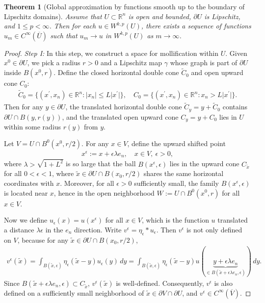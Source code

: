 \documentclass{article}
\numberwithin{equation}{section}
\newcommand{\bbR}{\mathbb{R}}
\newcommand{\ol}{\overline}
\newcommand{\wt}{\widetilde}
\theoremstyle{plain}
\newtheorem{theorem}{Theorem}[section]
\theoremstyle{definition}
\begin{document}
\begin{theorem}[Global approximation by functions smooth up to the boundary of Lipschitz domains]\label{thm:2.13}
Assume that $U\subset\bbR^n$ is open and bounded, $\partial U$ is Lipschitz, and $1\leq p<\infty$. Then for each $u\in W^{k,p}(U)$, there exists a sequence of functions $u_m\in C^\infty(\ol{U})$ such that $u_m\to u$ in $W^{k,p}(U)$ as $m\to\infty$.
\end{theorem}
\begin{proof}
\textit{Step I:} In this step, we construct a space for mollification within $U$. Given $x^0\in\partial U$, we pick a radius $r>0$ and a Lipschitz map $\gamma$ whose graph is part of $\partial U$ inside $B(x^0,r)$. Define the closed horizontal double cone $\wt C_0$ and open upward cone $C_0$:
\begin{align*}
\wt C_0=\{(x^\prime,x_n)\in\bbR^n:\vert x_n\vert\leq L\vert x^\prime\vert\},\quad C_0=\{(x^\prime,x_n)\in\bbR^n: x_n> L\vert x^\prime\vert\}.
\end{align*}
Then for any $y\in\partial U$, the translated horizontal double cone $\wt C_{y}=y+\wt C_0$ contains $\partial U\cap B(y,r(y))$, and the translated open upward cone $C_{y}=y+C_0$ lies in $U$ within some radius $r(y)$ from $y$.

Let $V=U\cap B^0(x^0,r/2)$. For any $x\in V$, define the upward shifted point
\begin{align*}
	x^\epsilon:=x+\epsilon\lambda e_n,\quad x\in V,\ \epsilon>0,
\end{align*}
where $\lambda>\sqrt{1+L^2}$ is so large that the ball $B(x^\epsilon,\epsilon)$ lies in the upward cone $C_{\tilde{x}}$ for all $0<\epsilon<1$, where $\tilde{x}\in\partial U\cap B(x_0,r/2)$ shares the same horizontal coordinates with $x$. Moreover, for all $\epsilon>0$ sufficiently small, the family $B(x^\epsilon,\epsilon)$ is located near $x$, hence in the open neighborhood $W:=U\cap B^0(x^0,r)$ for all $x\in V$.

Now we define $u_\epsilon(x)=u(x^\epsilon)$ for all $x\in V$, which is the function $u$ translated a distance $\lambda\epsilon$ in the $e_n$ direction. Write $v^\epsilon=\eta_\epsilon*u_\epsilon$. Then $v^\epsilon$ is not only defined on $V$, because for any $\tilde{x}\in\partial U\cap B(x_0,r/2)$,
\begin{align*}
	v^\epsilon(\tilde{x})=\int_{B(\tilde{x},\epsilon)}\eta_\epsilon(\tilde{x}-y)u_\epsilon(y)\,dy=\int_{B(\tilde{x},\epsilon)}\eta_\epsilon(\tilde{x}-y)u(\underbrace{y+\epsilon\lambda e_n}_{\in B(\tilde{x}+\epsilon\lambda e_n,\epsilon)})\,dy.
\end{align*}
Since $B(\tilde{x}+\epsilon\lambda e_n,\epsilon)\subset C_{\tilde{x}}$, $	v^\epsilon(\tilde{x})$ is well-defined. Consequently, $v^\epsilon$ is also defined on a sufficiently small neighborhood of $\tilde{x}\in\partial V\cap\partial U$, and $v^\epsilon\in C^\infty(\ol{V})$.


\end{proof}
\end{document}
